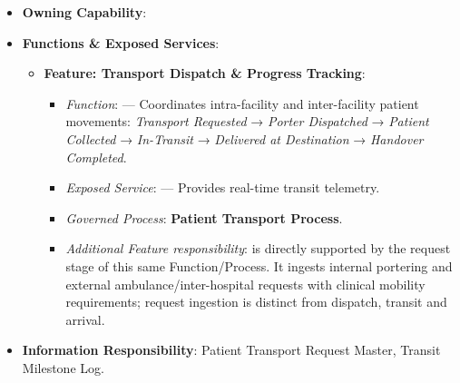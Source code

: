 \begin{itemize}

\item
\textbf{Owning Capability}: \texttt{}



\item
\textbf{Functions \& Exposed Services}:


\begin{itemize}

\item
\textbf{Feature: Transport Dispatch \& Progress Tracking}:


\begin{itemize}

\item
\emph{Function}: \texttt{} — Coordinates intra-facility and inter-facility patient movements: \emph{Transport Requested} → \emph{Porter Dispatched} → \emph{Patient Collected} → \emph{In-Transit} → \emph{Delivered at Destination} → \emph{Handover Completed}.



\item
\emph{Exposed Service}: \texttt{} — Provides real-time transit telemetry.



\item
\emph{Governed Process}: \textbf{Patient Transport Process}.



\item
\emph{Additional Feature responsibility}: \texttt{} is directly supported by the request stage of this same Function/\allowbreak{}Process. It ingests internal portering and external ambulance/\allowbreak{}inter-hospital requests with clinical mobility requirements; request ingestion is distinct from dispatch, transit and arrival.



\end{itemize}


\end{itemize}


\item
\textbf{Information Responsibility}: Patient Transport Request Master, Transit Milestone Log.



\end{itemize}
\label{rad:hso:259}


